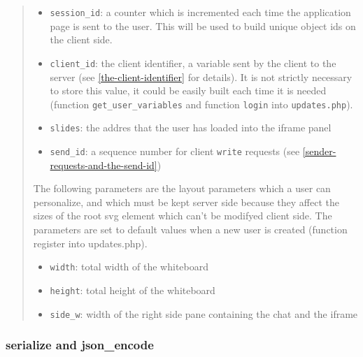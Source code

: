 \documentclass[10pt,a4paper,english]{book}
\begin{document}
\begin{itemize}
\begin{itemize}
\begin{quote}
\begin{itemize}
\item {} 
\texttt{session{\_}id}: a counter which is incremented each time the
application page is sent to the user. This will be used to
build unique object ids on the client side.

\item {} 
\texttt{client{\_}id}: the client identifier, a variable sent by the
client to the server (see \href{\#the-client-identifier}{\ref*{the-client-identifier}} for
details). It is not strictly necessary to store this value, it
could be easily built each time it is needed (function
\texttt{get{\_}user{\_}variables} and function \texttt{login} into
\texttt{updates.php}).

\item {} 
\texttt{slides}: the addres that the user has loaded into the iframe
panel

\item {} 
\texttt{send{\_}id}: a sequence number for client \texttt{write} requests
(see \href{\#sender-requests-and-the-send-id}{\ref*{sender-requests-and-the-send-id}})

\end{itemize}

The following parameters are the layout parameters which a user
can personalize, and which must be kept server side because they
affect the sizes of the root svg element which can't be modifyed
client side. The parameters are set to default values when a new
user is created (function register into updates.php).
\begin{itemize}
\item {} 
\texttt{width}: total width of the whiteboard

\item {} 
\texttt{height}: total height of the whiteboard

\item {} 
\texttt{side{\_}w}: width of the right side pane containing the chat
and the iframe

\end{itemize}
\end{quote}

\end{itemize}

\end{itemize}



\hypertarget{serialize-and-json-encode}{}
\subsubsection{serialize and json{\_}encode}
\label{serialize-and-json-encode}
\end{document}
